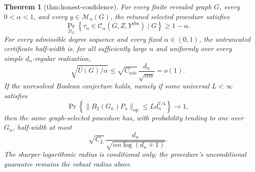 \documentclass{article}
\newtheorem{theorem}{Theorem}
\begin{document}
\begin{theorem}[thm:honest-confidence]\label{thm:honest-confidence}
For every finite revealed graph \(G\), every \(0<\alpha<1\), and every \(y\in\mathcal M_n(G)\), the retuned selected procedure satisfies
\[
\Pr_{\mathcal D_G}\!\left\{
\tau_n\in\mathcal C_\alpha(G,Z,Y^{\mathrm{obs}})\mid G
\right\}\ge1-\alpha.
\]
For every admissible degree sequence and every fixed \(\alpha\in(0,1)\), the untruncated certificate half-width is, for all sufficiently large \(n\) and uniformly over every simple \(d_n\)-regular realization,
\[
\sqrt{\overline U(G)/\alpha}
\le \sqrt{C_{\mathrm{rob}}}\,
\frac{d_n}{\sqrt{\alpha n}}=o(1).
\]
If the unresolved Boolean conjecture holds, namely if some universal \(L<\infty\) satisfies
\[
\Pr\!\left\{\|B_2(G_n)P_n\|_{\mathrm{op}}
\le Ld_n^{7/4}\right\}\longrightarrow1,
\]
then the same graph-selected procedure has, with probability tending to one over \(G_n\), half-width at most
\[
\sqrt{C_L}\,
\frac{d_n}{\sqrt{\alpha n\log(d_n+1)}}.
\]
The sharper logarithmic radius is conditional only; the procedure's unconditional guarantee remains the robust radius above.
\end{theorem}
\end{document}
